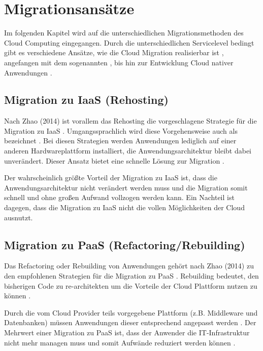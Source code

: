 \section{Migrationsansätze}

Im folgenden Kapitel wird auf die unterschiedlichen Migrationsmethoden des Cloud Computing eingegangen.
Durch die unterschiedlichen Servicelevel bedingt gibt es verschiedene Ansätze, wie die Cloud Migration realisierbar ist \cite[Vgl.][S. 226]{Surianarayanan2019},
angefangen mit dem sogenannten \grqq{}, bis hin zur Entwicklung Cloud nativer Anwendungen \cite[Vgl.][S. 144]{Zhao2014}.

\subsection{Migration zu IaaS (Rehosting)}
Nach Zhao (2014) ist vorallem das Rehosting die vorgeschlagene Strategie für die Migration zu \ac{IaaS} \cite[Vgl.][S. 144]{Zhao2014}.
Umgangssprachlich wird diese Vorgehensweise auch als \grqq{} bezeichnet \cite[Vgl.][]{NetApp}.
Bei diesen Strategien werden Anwendungen lediglich auf einer anderen Hardwareplattform installiert, die Anwendungsarchitektur bleibt dabei
unverändert. Dieser Ansatz bietet eine schnelle Lösung zur Migration \cite[Vgl.][]{CIO}.

Der wahrscheinlich größte Vorteil der Migration zu \ac{IaaS} ist, dass die Anwendungsarchitektur nicht verändert werden muss und die Migration somit
schnell und ohne großen Aufwand vollzogen werden kann. Ein Nachteil ist dagegen, dass die Migration zu \ac{IaaS} nicht die vollen Möglichkeiten der
Cloud ausnutzt.

\subsection{Migration zu PaaS (Refactoring/Rebuilding)}
Das Refactoring oder Rebuilding von Anwendungen gehört nach Zhao (2014) zu den empfohlenen Strategien für die Migration zu \ac{PaaS} \cite[Vgl.][S. 144]{Zhao2014}.
Rebuilding bedeutet, den bisherigen Code zu re-architekten um die Vorteile der Cloud Plattform nutzen zu können \cite[Vgl.][]{CIO}.

Durch die vom Cloud Provider teils vorgegebene Plattform (z.B. Middleware und Datenbanken) müssen Anwendungen dieser entsprechend angepasst werden \cite[Vgl.][S. 227]{Surianarayanan2019}.
Der Mehrwert einer Migration zu \ac{PaaS} ist, dass der Anwender die IT-Infrastruktur nicht mehr managen muss und somit Aufwände reduziert werden können
\cite[Vgl.][S. 6]{Pahl}.

